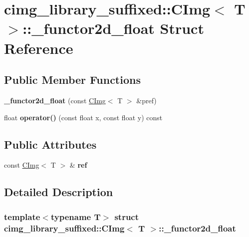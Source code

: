 \hypertarget{structcimg__library__suffixed_1_1CImg_1_1__functor2d__float}{}\section{cimg\+\_\+library\+\_\+suffixed\+:\+:C\+Img$<$ T $>$\+:\+:\+\_\+functor2d\+\_\+float Struct Reference}
\label{structcimg__library__suffixed_1_1CImg_1_1__functor2d__float}
\subsection*{Public Member Functions}
\begin{DoxyCompactItemize}
\item 
\mbox{\label{structcimg__library__suffixed_1_1CImg_1_1__functor2d__float_a3f5fbc638004f436de102e91e7c7815f}} 
{\bfseries \+\_\+functor2d\+\_\+float} (const \hyperlink{structcimg__library__suffixed_1_1CImg}{C\+Img}$<$ T $>$ \&pref)
\item 
\mbox{\label{structcimg__library__suffixed_1_1CImg_1_1__functor2d__float_a07d3963f01f4588d37b9d5de00ce686c}} 
float {\bfseries operator()} (const float x, const float y) const
\end{DoxyCompactItemize}
\subsection*{Public Attributes}
\begin{DoxyCompactItemize}
\item 
\mbox{\label{structcimg__library__suffixed_1_1CImg_1_1__functor2d__float_a6ea8592ea6d6bdc7b0e95d3f72a4aa20}} 
const \hyperlink{structcimg__library__suffixed_1_1CImg}{C\+Img}$<$ T $>$ \& {\bfseries ref}
\end{DoxyCompactItemize}


\subsection{Detailed Description}
\subsubsection*{template$<$typename T$>$\newline
struct cimg\+\_\+library\+\_\+suffixed\+::\+C\+Img$<$ T $>$\+::\+\_\+functor2d\+\_\+float}



